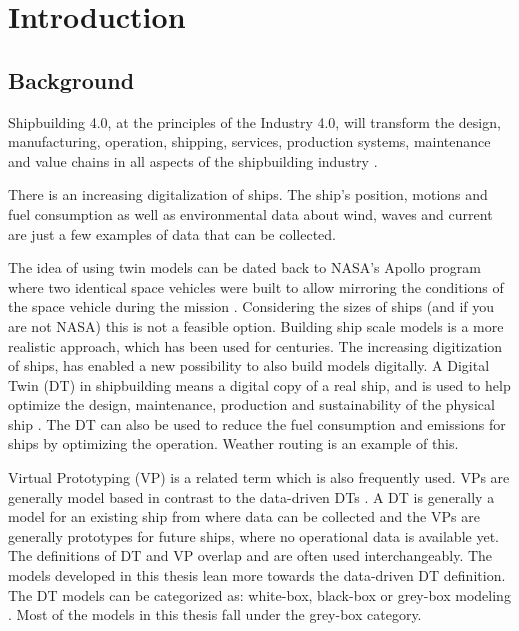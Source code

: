 \chapter{Introduction}
\section{Background}
Shipbuilding 4.0, at the principles of the Industry 4.0, will transform the design, manufacturing, operation, shipping, services, production systems, maintenance and value chains in all aspects of the shipbuilding industry \cite{stanic_toward_2018}.

There is an increasing digitalization of ships. The ship's position, motions and fuel consumption as well as environmental data about wind, waves and current are just a few examples of data that can be collected.   


The idea of using twin models can be dated back to NASA’s Apollo program where two identical space vehicles were built to allow mirroring the conditions of the space vehicle during the mission \cite{rosen_about_2015}. Considering the sizes of ships (and if you are not NASA) this is not a feasible option. Building ship scale models is a more realistic approach, which has been used for centuries. The increasing digitization of ships, has enabled a new possibility to also build models digitally. A Digital Twin (DT) in shipbuilding means a digital copy of a real ship, and is used to help optimize the design, maintenance, production and sustainability of the physical ship \cite{chen_review_2021}. The DT can also be used to reduce the fuel consumption and emissions for ships by optimizing the operation. Weather routing is an example of this. 

Virtual Prototyping (VP) is a related term which is also frequently used. VPs are generally model based in contrast to the data-driven DTs \cite{major_framework_2021}. A DT is generally a model for an existing ship from where data can be collected and the VPs are generally prototypes for future ships, where no operational data is available yet. The definitions of DT and VP overlap and are often used interchangeably. The models developed in this thesis lean more towards the data-driven DT definition. The DT models can be categorized as: white-box, black-box or grey-box modeling \cite{leifsson_grey-box_2008}. Most of the models in this thesis fall under the grey-box category.

